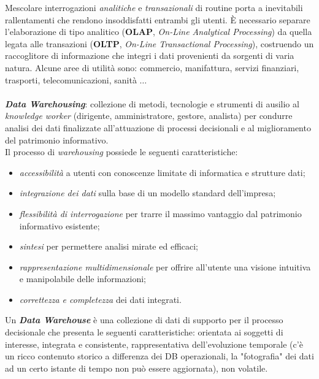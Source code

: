 \documentclass[a4paper, notitlepage, 9pt]{extreport}
\begin{document}
Mescolare interrogazioni \textit{analitiche} e \textit{transazionali} di routine porta a inevitabili rallentamenti che rendono insoddisfatti entrambi gli utenti. \MakeUppercase{è} necessario separare l'elaborazione di tipo analitico (\textbf{OLAP}, \textit{On-Line Analytical Processing}) da quella legata alle transazioni (\textbf{OLTP}, \textit{On-Line Transactional Processing}), costruendo un raccoglitore di informazione che integri i dati provenienti da sorgenti di varia natura.
Alcune aree di utilità sono: commercio, manifattura, servizi finanziari, trasporti, telecomunicazioni, sanità $\dots$
\\\\
\textit{\textbf{Data Warehousing}}: collezione di metodi, tecnologie e strumenti di ausilio al \textit{knowledge worker} (dirigente, amministratore, gestore, analista) per condurre analisi dei dati finalizzate all'attuazione di processi decisionali e al miglioramento del patrimonio informativo.
\\
Il processo di \textit{warehousing} possiede le seguenti caratteristiche:
\begin{itemize}
	\item \textit{accessibilità} a utenti con conoscenze limitate di informatica e strutture dati;
	\item \textit{integrazione dei dati} sulla base di un modello standard dell'impresa;
	\item \textit{flessibilità di interrogazione} per trarre il massimo vantaggio dal patrimonio informativo esistente;
	\item \textit{sintesi} per permettere analisi mirate ed efficaci;
	\item \textit{rappresentazione multidimensionale} per offrire all’utente una visione intuitiva e manipolabile delle informazioni;
	\item \textit{correttezza e completezza} dei dati integrati.
\end{itemize}
Un \textit{\textbf{Data Warehouse}} è una collezione di dati di supporto per il processo decisionale che presenta le seguenti caratteristiche: orientata ai soggetti di interesse, integrata e consistente, rappresentativa dell'evoluzione temporale (c'è un ricco contenuto storico a differenza dei DB operazionali, la "fotografia" dei dati ad un certo istante di tempo non può essere aggiornata), non volatile.
\newline
\end{document}
